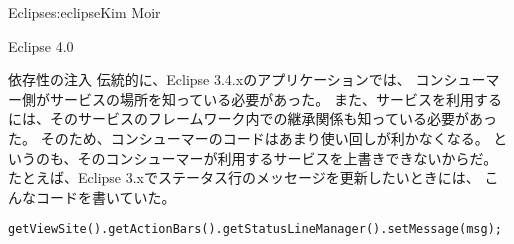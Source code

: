 \begin{aosachapter}{Eclipse}{s:eclipse}{Kim Moir}
\begin{aosasect1}{Eclipse 4.0}
\begin{aosasect2}{依存性の注入}
伝統的に、Eclipse 3.4.xのアプリケーションでは、
コンシューマー側がサービスの場所を知っている必要があった。
また、サービスを利用するには、そのサービスのフレームワーク内での継承関係も知っている必要があった。
そのため、コンシューマーのコードはあまり使い回しが利かなくなる。
というのも、そのコンシューマーが利用するサービスを上書きできないからだ。
たとえば、Eclipse 3.xでステータス行のメッセージを更新したいときには、
こんなコードを書いていた。

\begin{verbatim}
getViewSite().getActionBars().getStatusLineManager().setMessage(msg);
\end{verbatim}


\end{aosasect2}
\end{aosasect1}
\end{aosachapter}
